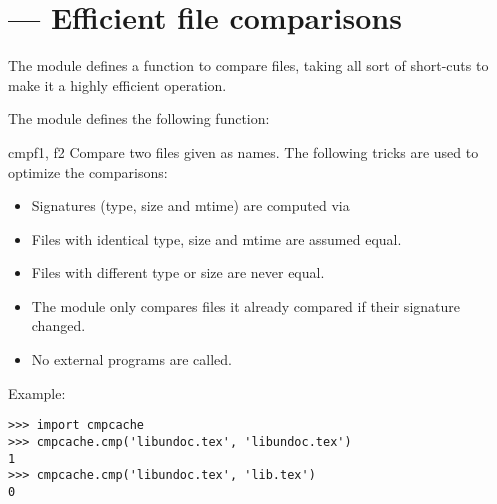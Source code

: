 \section{ ---
         Efficient file comparisons}


The  module defines a function to compare files, taking all
sort of short-cuts to make it a highly efficient operation.

The  module defines the following function:

\begin{funcdesc}{cmp}{f1, f2}
Compare two files given as names. The following tricks are used to
optimize the comparisons:

\begin{itemize}
        \item Signatures (type, size and mtime) are computed via
        \item Files with identical type, size and mtime are assumed equal.
        \item Files with different type or size are never equal.
        \item The module only compares files it already compared if their
              signature changed.
        \item No external programs are called.
\end{itemize}
\end{funcdesc}

Example:

\begin{verbatim}
>>> import cmpcache
>>> cmpcache.cmp('libundoc.tex', 'libundoc.tex')
1
>>> cmpcache.cmp('libundoc.tex', 'lib.tex')
0
\end{verbatim}
